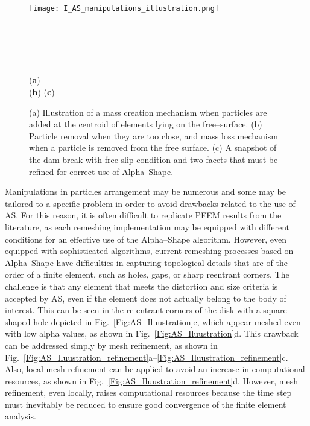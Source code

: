 \documentclass[final,3p,times]{elsarticle}
\begin{document}
\begin{figure}[t!]
\captionsetup[subfigure]{labelformat=empty}
\centering 
	\texttt{[image: I\_AS\_manipulations\_illustration.png]}
	\begin{subfigure}[b]{0.0\textwidth}	
		\caption{}\label{Fig:mani_cares_a}
	\end{subfigure}
	~
	\begin{subfigure}[b]{0.0\textwidth}	
		\caption{}
		\label{Fig:mani_cares_b}
	\end{subfigure}
	~
	\begin{subfigure}[b]{0.0\textwidth}	
		\caption{}\label{Fig:mani_cares_c}
	\end{subfigure}
	\vspace{-65mm}\\
	\hspace{-160mm}
	\footnotesize{(\textbf{a})}
	\vspace{25mm}\\ 
	\hspace{-60mm} (\textbf{b}) \hspace{95mm} (\textbf{c})
	\vspace{25mm}
	\\
	\caption{(a) Illustration of a mass creation mechanism when particles are added at the centroid of elements lying on the free--surface. (b) Particle removal when they are too close, and mass loss mechanism when a particle is removed from the free surface. (c) A snapshot of the dam break with free-slip condition and two facets that must be refined for correct use of Alpha--Shape.}
\label{Fig:mani_cares}
\end{figure}




Manipulations in particles arrangement may be numerous and some may be tailored to a specific problem in order to avoid drawbacks related to the use of AS. For this reason, it is often difficult to replicate PFEM results from the literature, as each remeshing implementation may be equipped with different conditions for an effective use of the Alpha--Shape algorithm. However, even equipped with sophisticated algorithms, current remeshing processes based on Alpha--Shape have difficulties in capturing topological details that are of the order of a finite element, such as holes, gaps, or sharp reentrant corners. The challenge is that any element that meets the distortion and size criteria is accepted by AS, even if the element does not actually belong to the body of interest. This can be seen in the re-entrant corners of the disk with a square--shaped hole depicted in Fig.~\ref{Fig:AS_Iluustration}e, which appear meshed even with low alpha values, as shown in Fig.~\ref{Fig:AS_Iluustration}d. This drawback can be addressed simply by mesh refinement, as shown in Fig.~\ref{Fig:AS_Iluustration_refinement}a--\ref{Fig:AS_Iluustration_refinement}c. Also, local mesh refinement can be applied to avoid an increase in computational resources, as shown in Fig.~\ref{Fig:AS_Iluustration_refinement}d. However, mesh refinement, even locally, raises computational resources because the time step must inevitably be reduced to ensure good convergence of the finite element analysis. 
\end{document}
